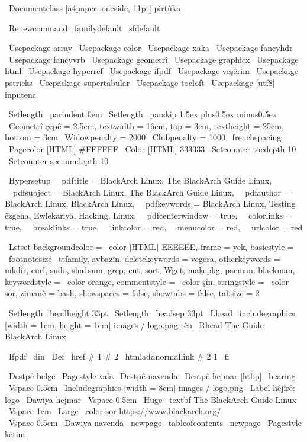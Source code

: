
\ Documentclass [a4paper, oneside, 11pt] {pirtûka}

\ Renewcommand {\ familydefault} {\ sfdefault}

\ Usepackage {array}
\ Usepackage {color}
\ Usepackage {xaka}
\ Usepackage {fancyhdr}
\ Usepackage {fancyvrb}
\ Usepackage {geometrî}
\ Usepackage {graphicx}
\ Usepackage {html}
\ Usepackage {hyperref}
\ Usepackage {ifpdf}
\ Usepackage {veşêrim}
\ Usepackage {pstricks}
\ Usepackage {supertabular}
\ Usepackage {tocloft}
\ Usepackage [utf8] {inputenc}

\ Setlength {\ parindent} {0em}
\ Setlength {\ parskip} {1.5ex plus0.5ex minus0.5ex}
\ Geometrî {çepê = 2.5cm, textwidth = 16cm, top = 3cm, textheight = 25cm, bottom = 3cm}
\ Widowpenalty = 2000
\ Clubpenalty = 1000
\ frenchspacing
\ Pagecolor [HTML] {#FFFFFF}
\ Color [HTML] {333333}
\ Setcounter {tocdepth} {10}
\ Setcounter {secnumdepth} {10}

\ Hypersetup {
  pdftitle = {BlackArch Linux, The BlackArch Guide Linux},
  pdfsubject = {BlackArch Linux, The BlackArch Guide Linux},
  pdfauthor = {BlackArch Linux, BlackArch Linux},
  pdfkeywords = {BlackArch Linux, Testing êzgeha, Ewlekariya, Hacking, Linux},
  pdfcenterwindow = true,
  colorlinks = true,
  breaklinks = true,
  linkcolor = red,
  menucolor = red,
  urlcolor = red
}

\ Lstset {
backgroundcolor = \ color [HTML] {EEEEEE},
frame = yek,
basicstyle = \ footnotesize \ ttfamily,
avbazîn,
deletekeywords = {vegera},
otherkeywords = {mkdir, curl, sudo, sha1sum, grep, cut, sort, Wget, makepkg,
pacman, blackman},
keywordstyle = \ color {orange},
commentstyle = \ color {şîn},
stringstyle = \ color {sor},
zimanê = bash,
showspaces = false,
showtabs = false,
tabsize = 2
}

\ Setlength {\ headheight} {33pt}
\ Setlength {\ headsep} {33pt}
\ Lhead {{\ includegraphics [width = 1cm, height = 1cm] {images / logo.png tên}}}
\ Rhead {The Guide BlackArch Linux}

\ Ifpdf \ din
\ Def \ href # 1 # 2 {\ htmladdnormallink {# 2} {1}}
\ fi

\ Destpê {belge}
\ Pagestyle {vala}
\ Destpê {navenda}
\ Destpê {hejmar} [htbp]
\ bearing
\ Vspace {0.5cm}
\ Includegraphics [width = 8cm] {images / logo.png}
\ Label {hêjîrê: logo}
\ Dawiya {hejmar}
\ Vspace {0.5cm}
\ Huge {\ textbf {The BlackArch Guide Linux}} \\
\ Vspace {1cm}
\ Large {\ color {sor}} https://www.blackarch.org/ \\
\ Vspace {0.5cm}
\ Dawiya {navenda}
\ newpage
\ tableofcontents
\ newpage
\ Pagestyle {ketim}

